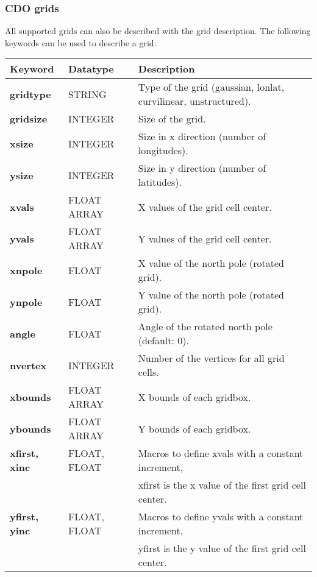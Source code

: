 \subsubsection{CDO grids}

All supported grids can also be described with the {\CDO} grid description.
The following keywords can be used to describe a grid:

\vspace{3mm}
\begin{tabular}[b]{lll}
Keyword           & Datatype     & Description \\ \hline
\bf{gridtype}     & STRING       & Type of the grid (gaussian, lonlat, curvilinear, unstructured). \\
\bf{gridsize}     & INTEGER      & Size of the grid. \\
\bf{xsize}        & INTEGER      & Size in x direction (number of longitudes). \\
\bf{ysize}        & INTEGER      & Size in y direction (number of latitudes). \\
\bf{xvals}        & FLOAT ARRAY  & X values of the grid cell center. \\
\bf{yvals}        & FLOAT ARRAY  & Y values of the grid cell center.\\
\bf{xnpole}       & FLOAT        & X value of the north pole (rotated grid). \\
\bf{ynpole}       & FLOAT        & Y value of the north pole (rotated grid). \\
\bf{angle}        & FLOAT        & Angle of the rotated north pole (default: 0). \\
\bf{nvertex}      & INTEGER      & Number of the vertices for all grid cells. \\
\bf{xbounds}      & FLOAT ARRAY  & X bounds of each gridbox. \\
\bf{ybounds}      & FLOAT ARRAY  & Y bounds of each gridbox. \\
\bf{xfirst, xinc} & FLOAT, FLOAT & Macros to define xvals with a constant increment, \\
                         &                         & xfirst is the x value of the first grid cell center. \\
\bf{yfirst, yinc} & FLOAT, FLOAT & Macros to define yvals with a constant increment, \\
                         &                         & yfirst is the y value of the first grid cell center. \\
\end{tabular}

